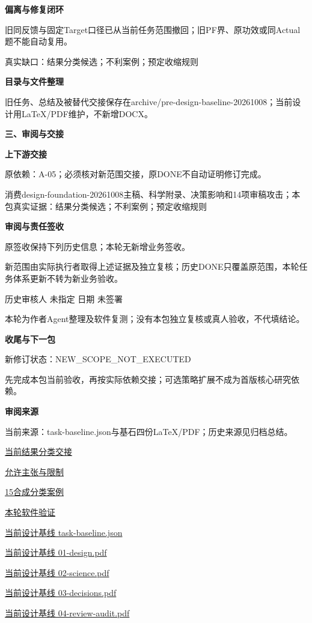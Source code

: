\documentclass[11pt,a4paper]{article}
\newcommand{\reviewsection}[1]{\par\Needspace{5\baselineskip}\vspace{10pt}\begin{center}{\titlelatin\titlecjk\bfseries\fontsize{14}{20}\selectfont #1}\end{center}}
\newcommand{\reviewsubsection}[1]{\par\Needspace{4\baselineskip}\vspace{4pt}\begin{center}{\titlelatin\titlecjk\bfseries\fontsize{12}{18}\selectfont #1}\end{center}}
\begin{document}
\reviewsubsection{2.3 偏离与修复闭环}
旧同反馈与固定Target口径已从当前任务范围撤回；旧PF界、原功效或同Actual题不能自动复用。


真实缺口：结果分类候选；不利案例；预定收缩规则


\reviewsubsection{2.4 目录与文件整理}
旧任务、总结及被替代交接保存在archive/\allowbreak{}pre-\allowbreak{}design-\allowbreak{}baseline-\allowbreak{}20261008；当前设计用LaTeX/\allowbreak{}PDF维护，不新增DOCX。


\reviewsection{三、审阅与交接}
\reviewsubsection{3.1 上下游交接}
原依赖：A-\allowbreak{}05；必须核对新范围交接，原DONE不自动证明修订完成。


消费design-\allowbreak{}foundation-\allowbreak{}20261008主稿、科学附录、决策影响和14项审稿攻击；本包真实证据：结果分类候选；不利案例；预定收缩规则


\reviewsubsection{3.2 审阅与责任签收}
原签收保持下列历史信息；本轮无新增业务签收。


新范围由实际执行者取得上述证据及独立复核；历史DONE只覆盖原范围，本轮任务体系更新不转为新业务验收。


历史审核人 未指定    日期 未签署


本轮为作者Agent整理及软件复测；没有本包独立复核或真人验收，不代填结论。


\reviewsubsection{3.3 收尾与下一包}
新修订状态：NEW\_\allowbreak{}SCOPE\_\allowbreak{}NOT\_\allowbreak{}EXECUTED


先完成本包当前验收，再按实际依赖交接；可选策略扩展不成为首版核心研究依赖。


\reviewsubsection{3.4 审阅来源}
当前来源：task-\allowbreak{}baseline.json与基石四份LaTeX/\allowbreak{}PDF；历史来源见归档总结。


\href{file:///D:/Agent/srp/agent/tasks/U12-10/outputs/current-classification.md}{当前结果分类交接}


\href{file:///D:/Agent/srp/agent/tasks/U12-10/outputs/claim-rules.md}{允许主张与限制}


\href{file:///D:/Agent/srp/agent/tasks/U12-10/outputs/synthetic-classification.json}{15合成分类案例}


\href{file:///D:/Agent/srp/agent/tasks/U12-10/evidence/verification.json}{本轮软件验证}


\href{file:///D:/Agent/srp/agent/design/design-foundation-20261008/task-baseline.json}{当前设计基线 task-\allowbreak{}baseline.json}


\href{file:///D:/Agent/srp/agent/design/design-foundation-20261008/01-design.pdf}{当前设计基线 01-\allowbreak{}design.pdf}


\href{file:///D:/Agent/srp/agent/design/design-foundation-20261008/02-science.pdf}{当前设计基线 02-\allowbreak{}science.pdf}


\href{file:///D:/Agent/srp/agent/design/design-foundation-20261008/03-decisions.pdf}{当前设计基线 03-\allowbreak{}decisions.pdf}


\href{file:///D:/Agent/srp/agent/design/design-foundation-20261008/04-review-audit.pdf}{当前设计基线 04-\allowbreak{}review-\allowbreak{}audit.pdf}
\end{document}
